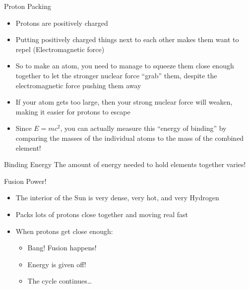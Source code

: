 \documentclass[pdf, aspectratio=169]{beamer}
\begin{document}
\begin{frame}{Proton Packing}
  \begin{itemize}
	\item Protons are positively charged
	\item Putting positively charged things next to each other makes them want to repel (Electromagnetic force)
	\item So to make an atom, you need to manage to squeeze them close enough together to let the stronger nuclear force ``grab'' them, despite the electromagnetic force pushing them away
	\item If your atom gets too large, then your strong nuclear force will weaken, making it easier for protons to escape
	\item Since $E=mc^2$, you can actually measure this ``energy of binding'' by comparing the masses of the individual atoms to the mass of the combined element!
  \end{itemize}
\end{frame}

\begin{frame}{Binding Energy}
  The amount of energy needed to hold elements together varies!
  \begin{center}
  \end{center}
\end{frame}

\begin{frame}{Fusion Power!}
  \begin{itemize}
	\item The interior of the Sun is very dense, very hot, and very Hydrogen
	\item Packs lots of protons close together and moving real fast
	\item When protons get close enough:
	  \begin{itemize}
		\item Bang! Fusion happens!
		\item Energy is given off!
		\item The cycle continues\ldots
	  \end{itemize}
  \end{itemize}
\end{frame}
\end{document}

